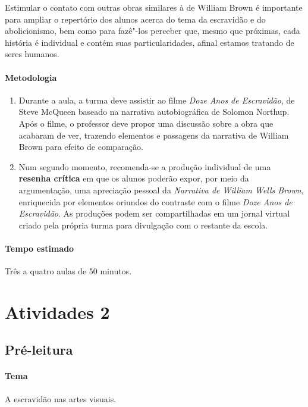 \documentclass[11pt]{extarticle}
\begin{document}
 Estimular o contato com outras obras similares à de William Brown
 é importante para ampliar o repertório dos alunos acerca do tema
 da escravidão e do abolicionismo, bem como para fazê"-los perceber
 que, mesmo que próximas, cada história é individual e contém 
 suas particularidades, afinal estamos tratando de seres humanos. 

 \paragraph{Metodologia}
   \begin{enumerate}
    \item 
    Durante a aula, a turma deve assistir ao filme \emph{Doze Anos de Escravidão},
    de Steve McQueen baseado na narrativa autobiográfica de Solomon Northup. 
    Após o filme, o professor deve propor uma discussão sobre a obra que acabaram de 
    ver, trazendo elementos e passagens da narrativa de William Brown 
    para efeito de comparação.

  \item
   Num segundo momento, recomenda-se a produção individual de uma
\textbf{resenha crítica} em que os
alunos poderão expor, por meio da argumentação, uma apreciação
pessoal da \emph{Narrativa de William Wells Brown}, enriquecida por
elementos oriundos do contraste com o filme \emph{Doze Anos de Escravidão}.
As produções podem ser compartilhadas em um jornal virtual criado 
pela própria turma para divulgação com o restante da escola.
   \end{enumerate}

 \paragraph{Tempo estimado} Três a quatro aulas de 50 minutos.


\section{Atividades 2}


\subsection{Pré-leitura}

 \paragraph{Tema} A escravidão nas artes visuais.
\end{document}
